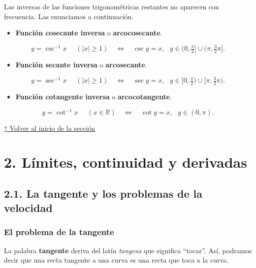 \documentclass[
  letterpaper,
]{book}
\providecommand{\tightlist}{%
  \setlength{\itemsep}{0pt}\setlength{\parskip}{0pt}}
\theoremstyle{plain}
\theoremstyle{remark}
\begin{document}
Las inversas de las funciones trigonométricas restantes no aparecen con
frecuencia. Las enunciamos a continuación.

\begin{itemize}
\tightlist
\item
  \textbf{Función cosecante inversa} o \textbf{arcocosecante}.
\end{itemize}

\[
y=\operatorname{csc}^{-1} x \,\, \quad (|x|\geq 1)\quad \Longleftrightarrow \quad\csc y=x, \,\,\,\, y\in (0,\tfrac{\pi}{2}]\cup (\pi,\tfrac{3}{2}\pi].
\]

\begin{itemize}
\tightlist
\item
  \textbf{Función secante inversa} o \textbf{arcosecante}.
\end{itemize}

\[
y=\operatorname{sec}^{-1} x \,\, \quad (|x|\geq 1)\quad \Longleftrightarrow \quad\sec y=x, \,\,\,\, y\in [0,\tfrac{\pi}{2})\cup [\pi,\tfrac{3}{2}\pi).
\]

\begin{itemize}
\tightlist
\item
  \textbf{Función cotangente inversa} o \textbf{arcocotangente}.
\end{itemize}

\[
y=\operatorname{cot}^{-1} x \,\, \quad (x\in\mathbb{R})\quad \Longleftrightarrow \quad\cot y=x, \,\,\,\, y\in (0,\pi).
\]

\hyperref[seccion_1.6]{↑ Volver al inicio de la sección}


\chapter{2. Límites, continuidad y
derivadas}\label{luxedmites-continuidad-y-derivadas}

\section{2.1. La tangente y los problemas de la
velocidad}\label{seccion_2.1}

\subsection{El problema de la
tangente}\label{el-problema-de-la-tangente}

La palabra \textbf{tangente} deriva del latín \emph{tangens} que
significa ``tocar''. Así, podramos decir que una recta tangente a una
curva es una recta que toca a la curva.
\end{document}
